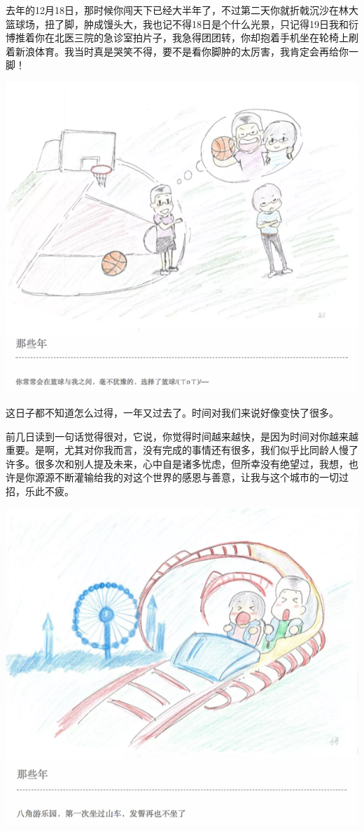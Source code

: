 \documentclass[]{book}
\begin{document}
去年的12月18日，那时候你闯天下已经大半年了，不过第二天你就折戟沉沙在林大篮球场，扭了脚，肿成馒头大，我也记不得18日是个什么光景，只记得19日我和衍博推着你在北医三院的急诊室拍片子，我急得团团转，你却抱着手机坐在轮椅上刷着新浪体育。我当时真是哭笑不得，要不是看你脚肿的太厉害，我肯定会再给你一脚！

\includegraphics[width=8.33in]{images/wife3}

这日子都不知道怎么过得，一年又过去了。时间对我们来说好像变快了很多。

前几日读到一句话觉得很对，它说，你觉得时间越来越快，是因为时间对你越来越重要。是啊，尤其对你我而言，没有完成的事情还有很多，我们似乎比同龄人慢了许多。很多次和别人提及未来，心中自是诸多忧虑，但所幸没有绝望过，我想，也许是你源源不断灌输给我的对这个世界的感恩与善意，让我与这个城市的一切过招，乐此不疲。

\includegraphics[width=8.33in]{images/wife4}
\end{document}
